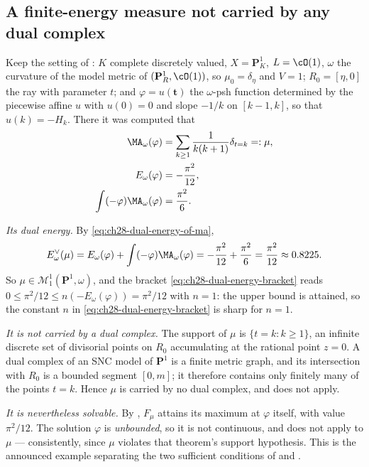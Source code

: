 \subsection{A finite-energy measure not carried by any dual complex}
\label{sec:ch28-not-skeletal}

\begin{example}
\label{ex:ch28-unbounded-dual-energy}
Keep the setting of : $K$ complete
discretely valued, $X=\mathbf P^1_K$, $L=\cO(1)$, $\omega$ the
curvature of the model metric of $(\mathbf P^1_R,\cO(1))$, so
$\mu_0=\delta_\eta$ and $V=1$; $R_0=[\eta,0]$ the ray with parameter
$t$; and $\varphi=u(\mathbf t)$ the $\omega$-psh function determined by
the piecewise affine $u$ with $u(0)=0$ and slope $-1/k$ on
$[k-1,k]$, so that $u(k)=-H_k$.  There it was computed that
\[
 \begin{aligned}
 \MA_\omega(\varphi)
   &=\sum_{k\geq1}\frac1{k(k+1)}\delta_{t=k}=: \mu,\\
 E_\omega(\varphi)&=-\frac{\pi^2}{12},\\
 \int(-\varphi)\MA_\omega(\varphi)&=\frac{\pi^2}6 .
 \end{aligned}
\]

\emph{Its dual energy.}  By \eqref{eq:ch28-dual-energy-of-ma},
\begin{equation}
\label{eq:ch28-unbounded-dual-energy}
 E^\vee_\omega(\mu)
 =E_\omega(\varphi)+\int(-\varphi)\MA_\omega(\varphi)
 =-\frac{\pi^2}{12}+\frac{\pi^2}{6}
 =\frac{\pi^2}{12}\approx0.8225 .
\end{equation}
So $\mu\in\mathcal M^1_1(\mathbf P^1,\omega)$, and the bracket
\eqref{eq:ch28-dual-energy-bracket} reads
$0\leq\pi^2/12\leq n(-E_\omega(\varphi))=\pi^2/12$ with $n=1$: the upper
bound is attained, so the constant $n$ in
\eqref{eq:ch28-dual-energy-bracket} is sharp for $n=1$.

\emph{It is not carried by a dual complex.}  The support of $\mu$ is
$\{t=k:k\geq1\}$, an infinite discrete set of divisorial points on
$R_0$ accumulating at the rational point $z=0$.  A dual complex of an
SNC model of $\mathbf P^1$ is a finite metric graph, and its intersection
with $R_0$ is a bounded segment $[0,m]$; it therefore contains only
finitely many of the points $t=k$.  Hence $\mu$ is carried by no dual
complex, and  does not apply.

\emph{It is nevertheless solvable.}  By
, $F_\mu$ attains its maximum at
$\varphi$ itself, with value $\pi^2/12$.  The solution $\varphi$ is
\emph{unbounded}, so it is not continuous, and
 does not apply to $\mu$ --- consistently, since
$\mu$ violates that theorem's support hypothesis.  This is the announced
example separating the two sufficient conditions of
 and .


\end{example}
